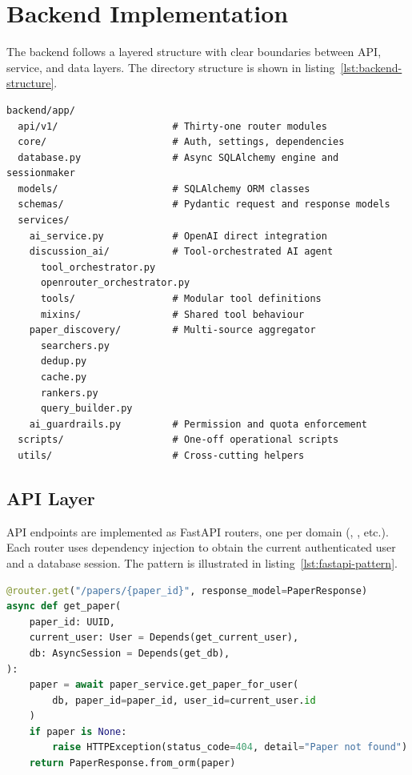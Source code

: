\section{Backend Implementation}
\label{sec:impl-backend}

The backend follows a layered structure with clear boundaries between API, service, and data layers. The directory structure is shown in listing~\ref{lst:backend-structure}.

\begin{lstlisting}[caption={Backend directory structure (selected entries).}, label={lst:backend-structure}, basicstyle=\ttfamily\small]
backend/app/
  api/v1/                    # Thirty-one router modules
  core/                      # Auth, settings, dependencies
  database.py                # Async SQLAlchemy engine and sessionmaker
  models/                    # SQLAlchemy ORM classes
  schemas/                   # Pydantic request and response models
  services/
    ai_service.py            # OpenAI direct integration
    discussion_ai/           # Tool-orchestrated AI agent
      tool_orchestrator.py
      openrouter_orchestrator.py
      tools/                 # Modular tool definitions
      mixins/                # Shared tool behaviour
    paper_discovery/         # Multi-source aggregator
      searchers.py
      dedup.py
      cache.py
      rankers.py
      query_builder.py
    ai_guardrails.py         # Permission and quota enforcement
  scripts/                   # One-off operational scripts
  utils/                     # Cross-cutting helpers
\end{lstlisting}

\subsection{API Layer}

API endpoints are implemented as FastAPI routers, one per domain (, , etc.). Each router uses dependency injection to obtain the current authenticated user and a database session. The pattern is illustrated in listing~\ref{lst:fastapi-pattern}.

\begin{lstlisting}[caption={Representative FastAPI endpoint with dependency injection (simplified).}, label={lst:fastapi-pattern}, language=Python]
@router.get("/papers/{paper_id}", response_model=PaperResponse)
async def get_paper(
    paper_id: UUID,
    current_user: User = Depends(get_current_user),
    db: AsyncSession = Depends(get_db),
):
    paper = await paper_service.get_paper_for_user(
        db, paper_id=paper_id, user_id=current_user.id
    )
    if paper is None:
        raise HTTPException(status_code=404, detail="Paper not found")
    return PaperResponse.from_orm(paper)
\end{lstlisting}

